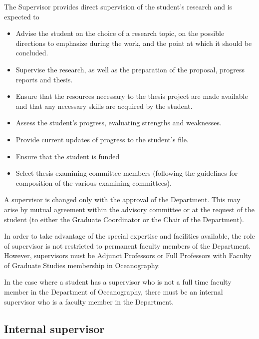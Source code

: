 \documentclass[12pt]{article}
\begin{document}
The Supervisor provides direct supervision of the student's research and is expected to
\begin{itemize}
\item Advise the student on the choice of a research topic, on the possible directions to emphasize during the work, and the point at which it should be concluded.
\item Supervise the research, as well as the preparation of the proposal, progress reports and thesis.
\item Ensure that the resources necessary to the thesis project are made available and that any necessary skills are acquired by the student.
\item Assess the student's progress, evaluating strengths and weaknesses.
\item Provide current updates of progress to the student's file.
\item Ensure that the student is funded
\item Select thesis examining committee members (following the guidelines for composition of the various examining committees).
\end{itemize}

A supervisor is changed only with the approval of the Department. This may
arise by mutual agreement within the advisory committee or at the request of
the student (to either the Graduate Coordinator or the Chair of the
Department).

In order to take advantage of the special expertise and facilities available,
the role of supervisor is not restricted to permanent faculty members of the
Department. However, supervisors must be Adjunct Professors or Full Professors
with Faculty of Graduate Studies membership in Oceanography.

In the case where a student has a supervisor who is not a full time faculty
member in the Department of Oceanography, there must be an internal supervisor
who is a faculty member in the Department.

\subsection{Internal supervisor}
\end{document}
